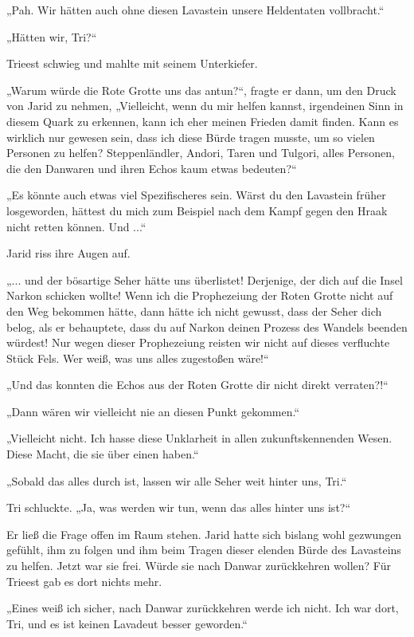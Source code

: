 „Pah. Wir hätten auch ohne diesen Lavastein unsere Heldentaten vollbracht.“

„Hätten wir, Tri?“

Trieest schwieg und mahlte mit seinem Unterkiefer.

„Warum würde die Rote Grotte uns das antun?“, fragte er dann, um den Druck von Jarid zu nehmen, „Vielleicht, wenn du mir helfen kannst, irgendeinen Sinn in diesem Quark zu erkennen, kann ich eher meinen Frieden damit finden. Kann es wirklich nur gewesen sein, dass ich diese Bürde tragen musste, um so vielen Personen zu helfen? Steppenländler, Andori, Taren und Tulgori, alles Personen, die den Danwaren und ihren Echos kaum etwas bedeuten?“

„Es könnte auch etwas viel Spezifischeres sein. Wärst du den Lavastein früher losgeworden, hättest du mich zum Beispiel nach dem Kampf gegen den Hraak nicht retten können. Und ...“

Jarid riss ihre Augen auf.

„... und der bösartige Seher hätte uns überlistet! Derjenige, der dich auf die Insel Narkon schicken wollte! Wenn ich die Prophezeiung der Roten Grotte nicht auf den Weg bekommen hätte, dann hätte ich nicht gewusst, dass der Seher dich belog, als er behauptete, dass du auf Narkon deinen Prozess des Wandels beenden würdest! Nur wegen dieser Prophezeiung reisten wir nicht auf dieses verfluchte Stück Fels. Wer weiß, was uns alles zugestoßen wäre!“

„Und das konnten die Echos aus der Roten Grotte dir nicht direkt verraten?!“

„Dann wären wir vielleicht nie an diesen Punkt gekommen.“

„Vielleicht nicht. Ich hasse diese Unklarheit in allen zukunftskennenden Wesen. Diese Macht, die sie über einen haben.“

„Sobald das alles durch ist, lassen wir alle Seher weit hinter uns, Tri.“

Tri schluckte. „Ja, was werden wir tun, wenn das alles hinter uns ist?“

Er ließ die Frage offen im Raum stehen. Jarid hatte sich bislang wohl gezwungen gefühlt, ihm zu folgen und ihm beim Tragen dieser elenden Bürde des Lavasteins zu helfen. Jetzt war sie frei. Würde sie nach Danwar zurückkehren wollen? Für Trieest gab es dort nichts mehr.

„Eines weiß ich sicher, nach Danwar zurückkehren werde ich nicht. Ich war dort, Tri, und es ist keinen Lavadeut besser geworden.“

